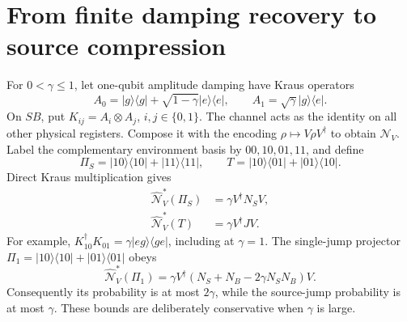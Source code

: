 \documentclass[11pt]{article}
\newcommand{\ket}[1]{|#1\rangle}
\newcommand{\bra}[1]{\langle#1|}
\begin{document}
\section{From finite damping recovery to source compression}
For $0<\gamma\leq1$, let one-qubit amplitude damping have Kraus operators
\begin{equation}
 A_0=\ket g\bra g+\sqrt{1-\gamma}\ket e\bra e,
 \qquad A_1=\sqrt\gamma\ket g\bra e.
\end{equation}
On $SB$, put $K_{ij}=A_i\otimes A_j$, $i,j\in\{0,1\}$. The channel acts as the identity on all other physical registers. Compose it with the encoding $\rho\mapsto V\rho V^\dagger$ to obtain $\mathcal N_V$. Label the complementary environment basis by $00,10,01,11$, and define
\begin{equation}
 \Pi_S=\ket{10}\bra{10}+\ket{11}\bra{11},\qquad
 T=\ket{10}\bra{01}+\ket{01}\bra{10}.
\end{equation}
Direct Kraus multiplication gives
\begin{align}
 \widehat{\mathcal N}_V^*(\Pi_S)&=\gamma V^\dagger N_S V,\label{eq:pullP}\\
 \widehat{\mathcal N}_V^*(T)&=\gamma V^\dagger J V.\label{eq:pullJ}
\end{align}
For example, $K_{10}^\dagger K_{01}=\gamma\ket{eg}\bra{ge}$, including at $\gamma=1$. The single-jump projector $\Pi_1=\ket{10}\bra{10}+\ket{01}\bra{01}$ obeys
\begin{equation}
 \widehat{\mathcal N}_V^*(\Pi_1)
 =\gamma V^\dagger(N_S+N_B-2\gamma N_SN_B)V.
\end{equation}
Consequently its probability is at most $2\gamma$, while the source-jump probability is at most $\gamma$. These bounds are deliberately conservative when $\gamma$ is large.
\end{document}
